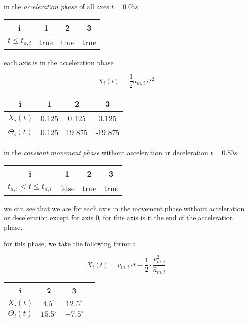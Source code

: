 \documentclass[%
  professionalfonts,%
  xcolor={%
    usenames,%
    dvipsnames,%
    svgnames,%
    table,%
    hyperref%
  }%
]{beamer}
\begin{document}
\begin{frame}
in the \emph{acceleration phase} of all axes $t = 0.05s$:

\begin{center}
\begin{tabular}{cccc}
\toprule
i & 1 & 2 & 3 \\
\midrule
$t \leq t_{a,i}$ & true & true & true \\
\bottomrule
\end{tabular}
\end{center}

each axis is in the acceleration phase


\begin{equation*}
X_{i}(t) = \frac{1}{2} \hat{a}_{m,i} \cdot t^2
\end{equation*}

\begin{center}
\begin{tabular}{cccc}
\toprule
i & 1 & 2 & 3 \\
\midrule
$X_{i}(t)$      & 0.125 & 0.125  & 0.125 \\
$\Theta_{i}(t)$ & 0.125 & 19.875 & -19.875\\
\bottomrule
\end{tabular}
\end{center}
\end{frame}

\begin{frame}
in the \emph{constant movement phase} without acceleration or deceleration $t = 0.80s$

\begin{center}
\begin{tabular}{cccc}
\toprule
i & 1 & 2 & 3 \\
\midrule
$t_{a,i} < t \leq t_{d,i}$ & false & true & true \\
\bottomrule
\end{tabular}
\end{center}

we can see that we are for each axis in the movement phase without acceleration or deceleration except for
axis 0, for this axis is it the end of the acceleration phase.

for this phase, we take the following formula

\begin{equation*}
X_{i}(t) = v_{m,i} \cdot t - \frac{1}{2} \cdot \frac{v_{m,i}^2}{\hat{a}_{m,i}}
\end{equation*}

\begin{center}
\begin{tabular}{cccc}
\toprule
i & 2 & 3 \\
\midrule
$X_{i}(t)$      & $4.5^\circ$  & $12.5^\circ$ \\ 
$\Theta_{i}(t)$ & $15.5^\circ$ & $-7.5^\circ$ \\
\bottomrule
\end{tabular}
\end{center}
\end{frame}
\end{document}
